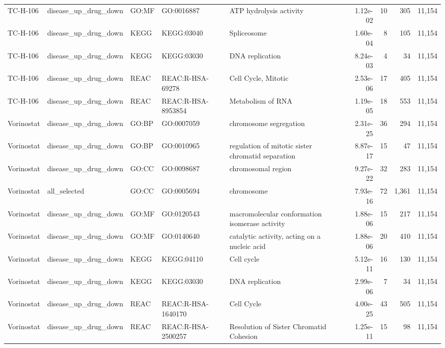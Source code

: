 \begin{landscape}
\begin{longtable}{@{}p{2.0cm}p{3.1cm}p{1.2cm}p{2.2cm}p{6.3cm}rrrr@{}}
TC-H-106 & disease\_up\_drug\_down & GO:MF & GO:0016887 & ATP hydrolysis activity & 1.12e-02 & 10 & 305 & 11,154 \\
TC-H-106 & disease\_up\_drug\_down & KEGG & KEGG:03040 & Spliceosome & 1.60e-04 & 8 & 105 & 11,154 \\
TC-H-106 & disease\_up\_drug\_down & KEGG & KEGG:03030 & DNA replication & 8.24e-03 & 4 & 34 & 11,154 \\
TC-H-106 & disease\_up\_drug\_down & REAC & REAC:R-HSA-69278 & Cell Cycle, Mitotic & 2.53e-06 & 17 & 405 & 11,154 \\
TC-H-106 & disease\_up\_drug\_down & REAC & REAC:R-HSA-8953854 & Metabolism of RNA & 1.19e-05 & 18 & 553 & 11,154 \\
Vorinostat & disease\_up\_drug\_down & GO:BP & GO:0007059 & chromosome segregation & 2.31e-25 & 36 & 294 & 11,154 \\
Vorinostat & disease\_up\_drug\_down & GO:BP & GO:0010965 & regulation of mitotic sister chromatid separation & 8.87e-17 & 15 & 47 & 11,154 \\
Vorinostat & disease\_up\_drug\_down & GO:CC & GO:0098687 & chromosomal region & 9.27e-22 & 32 & 283 & 11,154 \\
Vorinostat & all\_selected & GO:CC & GO:0005694 & chromosome & 7.93e-16 & 72 & 1,361 & 11,154 \\
Vorinostat & disease\_up\_drug\_down & GO:MF & GO:0120543 & macromolecular conformation isomerase activity & 1.88e-06 & 15 & 217 & 11,154 \\
Vorinostat & disease\_up\_drug\_down & GO:MF & GO:0140640 & catalytic activity, acting on a nucleic acid & 1.88e-06 & 20 & 410 & 11,154 \\
Vorinostat & disease\_up\_drug\_down & KEGG & KEGG:04110 & Cell cycle & 5.12e-11 & 16 & 130 & 11,154 \\
Vorinostat & disease\_up\_drug\_down & KEGG & KEGG:03030 & DNA replication & 2.99e-06 & 7 & 34 & 11,154 \\
Vorinostat & disease\_up\_drug\_down & REAC & REAC:R-HSA-1640170 & Cell Cycle & 4.00e-25 & 43 & 505 & 11,154 \\
Vorinostat & disease\_up\_drug\_down & REAC & REAC:R-HSA-2500257 & Resolution of Sister Chromatid Cohesion & 1.25e-11 & 15 & 98 & 11,154 \\
\end{longtable}
\addtocounter{table}{-1}
\endgroup
\end{landscape}
